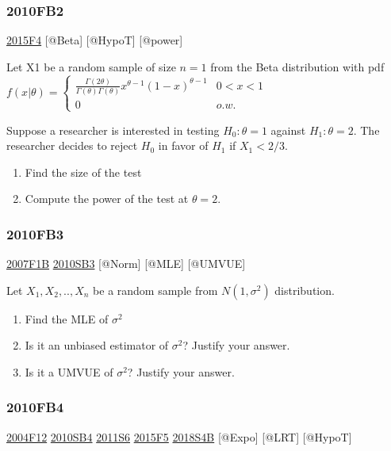 \documentclass[6pt,twocolumn,Portrait]{article}
\begin{document}
\hypertarget{fb2-1}{%
\subsubsection{2010FB2}\label{fb2-1}}

\protect\hyperlink{f4-5}{2015F4} {[}@Beta{]} {[}@HypoT{]} {[}@power{]}

Let X1 be a random sample of size \(n=1\) from the Beta distribution
with pdf
\(f(x|\theta)=\begin{cases}\frac{\Gamma(2\theta)}{\Gamma(\theta)\Gamma(\theta)}x^{\theta-1}(1-x)^{\theta-1}&0<x<1\\0&o.w.\end{cases}\)

Suppose a researcher is interested in testing \(H_0:\theta=1\) against
\(H_1:\theta=2\). The researcher decides to reject \(H_0\) in favor of
\(H_1\) if \(X_1<2/3\).

\begin{enumerate}
\def\labelenumi{(\alph{enumi})}
\item
  Find the size of the test
\item
  Compute the power of the test at \(\theta=2\).
\end{enumerate}

\hypertarget{fb3-1}{%
\subsubsection{2010FB3}\label{fb3-1}}

\protect\hyperlink{f1b}{2007F1B} \protect\hyperlink{sb3-1}{2010SB3}
{[}@Norm{]} {[}@MLE{]} {[}@UMVUE{]}

Let \(X_1,X_2,..,X_n\) be a random sample from \(N(1,\sigma^2)\)
distribution.

\begin{enumerate}
\def\labelenumi{(\alph{enumi})}
\item
  Find the MLE of \(\sigma^2\)
\item
  Is it an unbiased estimator of \(\sigma^2\)? Justify your answer.
\item
  Is it a UMVUE of \(\sigma^2\)? Justify your answer.
\end{enumerate}

\hypertarget{fb4-1}{%
\subsubsection{2010FB4}\label{fb4-1}}

\protect\hyperlink{f12}{2004F12} \protect\hyperlink{sb4}{2010SB4}
\protect\hyperlink{s6-2}{2011S6} \protect\hyperlink{f5-5}{2015F5}
\protect\hyperlink{s4b-2}{2018S4B} {[}@Expo{]} {[}@LRT{]} {[}@HypoT{]}
\end{document}
